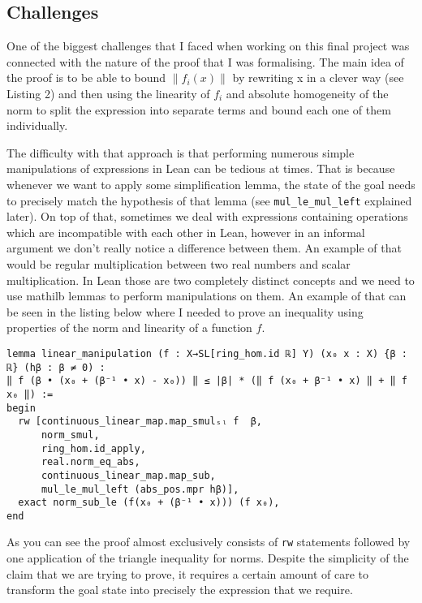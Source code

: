 \documentclass[11pt]{article}
\newenvironment{code}{\captionsetup{type=listing}}{}
\begin{document}
\subsection*{Challenges}
One of the biggest challenges that I faced when working on this final project was
connected with the nature of the proof that I was formalising. The main idea of the
proof is to be able to bound $\|f_i (x)\|$ by rewriting x in a clever way (see Listing 2)
and then using the linearity of $f_i$ and absolute homogeneity of the norm
to split the expression into separate terms and bound each one of them individually.

The difficulty with that approach is that performing numerous simple manipulations of
expressions in Lean can be tedious at times. That is because whenever we want to apply
some simplification lemma, the state of the goal needs to precisely match the hypothesis
of that lemma (see \texttt{mul\_le\_mul\_left} explained later). On top of that, sometimes
we deal with expressions containing operations which are incompatible with each other in
Lean, however in an informal argument we don't really notice a difference between them.
An example of that would be regular multiplication between two real numbers and scalar
multiplication. In Lean those are two completely distinct concepts and we need to
use mathilb lemmas to perform manipulations on them. An example of that can be seen
in the listing below where I needed to prove an inequality using properties of the norm and
linearity of a function $f$.
\begin{code}
\begin{verbatim}
lemma linear_manipulation (f : X→SL[ring_hom.id ℝ] Y) (x₀ x : X) {β : ℝ} (hβ : β ≠ 0) :
‖ f (β • (x₀ + (β⁻¹ • x) - x₀)) ‖ ≤ |β| * (‖ f (x₀ + β⁻¹ • x) ‖ + ‖ f x₀ ‖) :=
begin
  rw [continuous_linear_map.map_smulₛₗ f  β,
      norm_smul,
      ring_hom.id_apply,
      real.norm_eq_abs,
      continuous_linear_map.map_sub,
      mul_le_mul_left (abs_pos.mpr hβ)],
  exact norm_sub_le (f(x₀ + (β⁻¹ • x))) (f x₀),
end
\end{verbatim}
\end{code}

As you can see the proof almost exclusively consists of \texttt{rw} statements
followed by one application of the triangle inequality for norms. Despite the
simplicity of the claim that we are trying to prove, it requires a certain amount
of care to transform the goal state into precisely the expression that we require.
\end{document}
